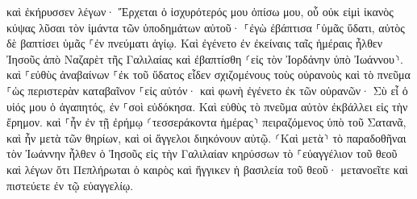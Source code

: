 \documentclass{openreader}
\begin{document}
καὶ ἐκήρυσσεν λέγων· Ἔρχεται ὁ ἰσχυρότερός μου ὀπίσω μου, οὗ οὐκ εἰμὶ ἱκανὸς κύψας λῦσαι τὸν ἱμάντα τῶν ὑποδημάτων αὐτοῦ· 
⸀ἐγὼ ἐβάπτισα ⸀ὑμᾶς ὕδατι, αὐτὸς δὲ βαπτίσει ὑμᾶς ⸀ἐν πνεύματι ἁγίῳ. 
Καὶ ἐγένετο ἐν ἐκείναις ταῖς ἡμέραις ἦλθεν Ἰησοῦς ἀπὸ Ναζαρὲτ τῆς Γαλιλαίας καὶ ἐβαπτίσθη ⸂εἰς τὸν Ἰορδάνην ὑπὸ Ἰωάννου⸃. 
καὶ ⸀εὐθὺς ἀναβαίνων ⸀ἐκ τοῦ ὕδατος εἶδεν σχιζομένους τοὺς οὐρανοὺς καὶ τὸ πνεῦμα ⸀ὡς περιστερὰν καταβαῖνον ⸀εἰς αὐτόν· 
καὶ φωνὴ ἐγένετο ἐκ τῶν οὐρανῶν· Σὺ εἶ ὁ υἱός μου ὁ ἀγαπητός, ἐν ⸀σοὶ εὐδόκησα. 
Καὶ εὐθὺς τὸ πνεῦμα αὐτὸν ἐκβάλλει εἰς τὴν ἔρημον. 
καὶ ⸀ἦν ἐν τῇ ἐρήμῳ ⸂τεσσεράκοντα ἡμέρας⸃ πειραζόμενος ὑπὸ τοῦ Σατανᾶ, καὶ ἦν μετὰ τῶν θηρίων, καὶ οἱ ἄγγελοι διηκόνουν αὐτῷ. 
⸂Καὶ μετὰ⸃ τὸ παραδοθῆναι τὸν Ἰωάννην ἦλθεν ὁ Ἰησοῦς εἰς τὴν Γαλιλαίαν κηρύσσων τὸ ⸀εὐαγγέλιον τοῦ θεοῦ 
καὶ λέγων ὅτι Πεπλήρωται ὁ καιρὸς καὶ ἤγγικεν ἡ βασιλεία τοῦ θεοῦ· μετανοεῖτε καὶ πιστεύετε ἐν τῷ εὐαγγελίῳ. 
\end{document}
